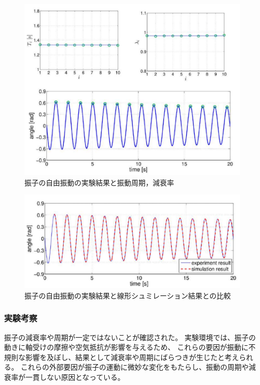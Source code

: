 \newpage

\begin{figure}[H]
  \centering
  \includegraphics[scale=0.7]{sozai/8.pdf}
  \caption{振子の自由振動の実験結果と振動周期，減衰率}
\end{figure}

\begin{figure}[H]
  \centering
  \includegraphics[scale=0.7]{sozai/9.pdf}
  \caption{振子の自由振動の実験結果と線形シュミレーション結果との比較}
\end{figure}


\subsubsection{実験考察}

振子の減衰率や周期が一定ではないことが確認された。
実験環境では、振子の動きに軸受けの摩擦や空気抵抗が影響を与えるため、
これらの要因が振動に不規則な影響を及ぼし、結果として減衰率や周期にばらつきが生じたと考えられる。
これらの外部要因が振子の運動に微妙な変化をもたらし、振動の周期や減衰率が一貫しない原因となっている。

